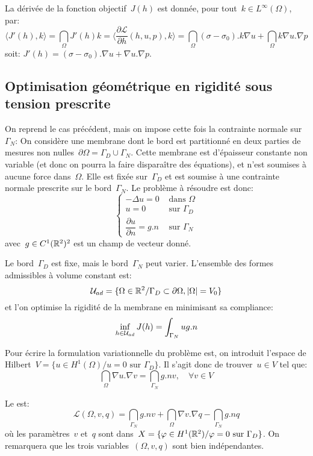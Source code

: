 \medskip
La dérivée de la fonction objectif~$J(h)$ est donnée, pour tout~$k\in L^\infty(\Omega)$, par:
\[ \langle J'(h),k\rangle = \dint_\Omega J'(h)k = \langle\dfrac{\partial\mathcal{L}}{\partial h}(h,u,p),k\rangle = \dint_\Omega (\sigma-\sigma_0).k\nabla u+\dint_\Omega k\nabla u.\nabla p  \]
soit: $J'(h)=(\sigma-\sigma_0).\nabla u + \nabla u.\nabla p$.


\medskip
\subsection{Optimisation géométrique en rigidité sous tension prescrite}

On reprend le cas précédent, mais on impose cette fois la contrainte normale sur~$\Gamma_N$:
On considère une membrane dont le bord est partitionné en deux parties de mesures non nulles~$\partial\Omega=\Gamma_D\cup\Gamma_N$. Cette membrane est d'épaisseur constante non variable (et donc on pourra la faire disparaître des équations), et n'est soumises à aucune force dans~$\Omega$. Elle est fixée sur~$\Gamma_D$ et est soumise à une contrainte normale prescrite sur le bord~$\Gamma_N$. Le problème à résoudre est donc:
\[\left\{\begin{array}{ll} -\Delta u =0 &\text{ dans }\Omega\\ 
u=0 &\text{ sur }\Gamma_D\\ 
\dfrac{\partial u}{\partial n} =g.n &\text{ sur }\Gamma_N 
\end{array} \right. \]
avec~$g\in C^1(\mathbb R^2)^2$ est un champ de vecteur donné.

Le bord~$\Gamma_D$ est fixe, mais le bord~$\Gamma_N$ peut varier. L'ensemble des formes admissibles à volume constant est:
\[ \mathcal{U}_{ad} = \{ \Omega\in\mathbb R^2/ \Gamma_D\subset\partial\Omega, |\Omega|=V_0 \} \]
et l'on optimise la rigidité de la membrane en minimisant sa compliance:
\[\colorblue \inf_{h\in\mathcal{U}_{ad}} J(h) = \dint_{\Gamma_N} ug.n \]

\medskip
Pour écrire la formulation variationnelle du problème est, on introduit l'espace de Hilbert~$V=\{u\in H^1(\Omega)/ u=0 \text{ sur }\Gamma_D\}$. Il s'agit donc de trouver~$u\in V$ tel que:
\[ \dint_\Omega \nabla u.\nabla v=\dint_{\Gamma_N} g.nv, \quad \forall v\in V \]

Le  est:
\[ \mathcal{L}(\Omega,v,q) = \dint_{\Gamma_N} g.nv + \dint_\Omega \nabla v.\nabla q - \dint_{\Gamma_N} g.nq \]
où les paramètres~$v$ et~$q$ sont dans~$X=\{\varphi\in H^1(\mathbb R^2)/ \varphi=0 \text{ sur }\Gamma_D \}$.
On remarquera que les trois variables~$(\Omega,v,q)$ sont bien indépendantes.

